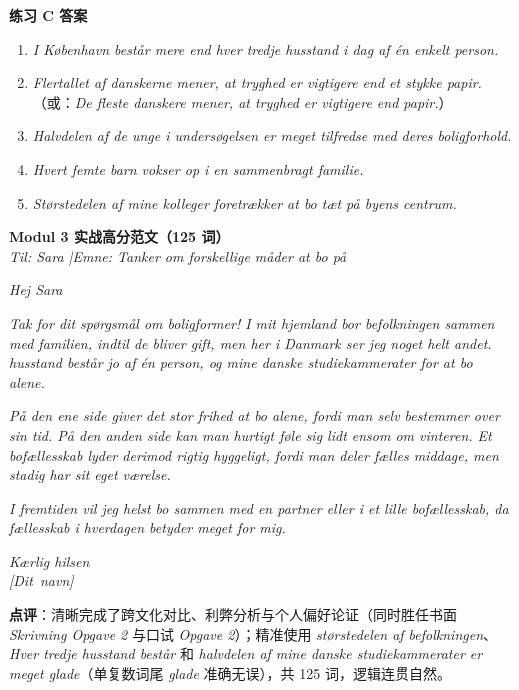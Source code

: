 \begin{answerbox}
\textbf{练习 C 答案}
\begin{enumerate}
  \item \textit{I København består mere end hver tredje husstand i dag af én enkelt person.}
  \item \textit{Flertallet af danskerne mener, at tryghed er vigtigere end et stykke papir.}（或：\textit{De fleste danskere mener, at tryghed er vigtigere end papir.}）
  \item \textit{Halvdelen af de unge i undersøgelsen er meget tilfredse med deres boligforhold.}
  \item \textit{Hvert femte barn vokser op i en sammenbragt familie.}
  \item \textit{Størstedelen af mine kolleger foretrækker at bo tæt på byens centrum.}
\end{enumerate}

\textbf{Modul 3 实战高分范文（125 词）}\\
\textit{Til: Sara \quad|\quad Emne: Tanker om forskellige måder at bo på}

\textit{Hej Sara}

\textit{Tak for dit spørgsmål om boligformer! I mit hjemland bor  befolkningen sammen med familien, indtil de bliver gift, men her i Danmark ser jeg noget helt andet.  husstand består jo af én person, og  mine danske studiekammerater  for at bo alene.}

\textit{På den ene side giver det stor frihed at bo alene, fordi man selv bestemmer over sin tid. På den anden side kan man hurtigt føle sig lidt ensom om vinteren. Et bofællesskab lyder derimod rigtig hyggeligt, fordi man deler fælles middage, men stadig har sit eget værelse.}

\textit{I fremtiden vil jeg helst bo sammen med en partner eller i et lille bofællesskab, da fællesskab i hverdagen betyder meget for mig.}

\textit{Kærlig hilsen\\
\mbox{[Dit navn]}}

\small\textbf{点评}：清晰完成了跨文化对比、利弊分析与个人偏好论证（同时胜任书面 \textit{Skrivning Opgave 2} 与口试 \textit{Opgave 2}）；精准使用 \textit{størstedelen af befolkningen}、\textit{Hver tredje husstand består} 和 \textit{halvdelen af mine danske studiekammerater er meget glade}（单复数词尾 \textit{glade} 准确无误），共 125 词，逻辑连贯自然。
\end{answerbox}